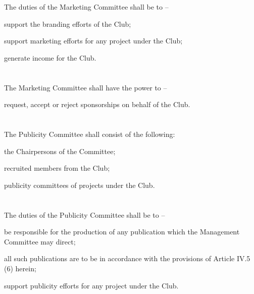 \section{}
The duties of the Marketing Committee shall be to –
	\begin{legal}
	\item support the branding efforts of the Club;
	\item support marketing efforts for any project under the Club;
	\item generate income for the Club.
	\end{legal}

\section{}
The Marketing Committee shall have the power to –
	\begin{legal}
	\item request, accept or reject sponsorships on behalf of the Club.
	\end{legal}

\section{}
The Publicity Committee shall consist of the following:
	\begin{legal}
	\item the Chairpersons of the Committee;
	\item recruited members from the Club;
	\item publicity committees of projects under the Club.
	\end{legal}

\section{}
The duties of the Publicity Committee shall be to –
\begin{legal}
	\item be responsible for the production of any publication which the Management Committee may direct;
		\begin{legal}
		\item all such publications are to be in accordance with the provisions of Article IV.5 (6) herein;
		\end{legal}
	\item support publicity efforts for any project under the Club.
	\end{legal}

